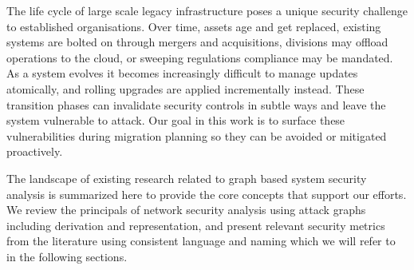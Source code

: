 The life cycle of large scale legacy infrastructure poses a unique security challenge to established organisations. Over time, assets age and get replaced, existing systems are bolted on through mergers and acquisitions, divisions may offload operations to the cloud, or sweeping regulations compliance may be mandated. As a system evolves it becomes increasingly difficult to manage updates atomically, and rolling upgrades are applied incrementally instead. These transition phases can invalidate security controls in subtle ways and leave the system vulnerable to attack. Our goal in this work is to surface these vulnerabilities during migration planning so they can be avoided or mitigated proactively.

The landscape of existing research related to graph based system security analysis is summarized here to provide the core concepts that support our efforts. We review the principals of network security analysis using attack graphs including derivation and representation, and present relevant security metrics from the literature using consistent language and naming which we will refer to in the following sections. 


